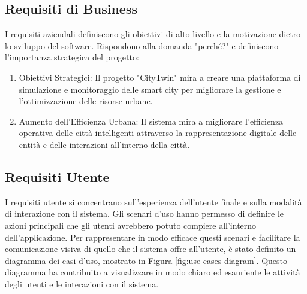 \documentclass[12pt]{article}
\begin{document}
\subsection{Requisiti di Business}
I requisiti aziendali definiscono gli obiettivi di alto livello e la motivazione dietro lo sviluppo del software. Rispondono alla domanda "perché?" e definiscono l'importanza strategica del progetto:
\begin{enumerate}
    \item Obiettivi Strategici: Il progetto "CityTwin" mira a creare una piattaforma di simulazione e monitoraggio delle smart city per migliorare la gestione e l'ottimizzazione delle risorse urbane.
    \item Aumento dell'Efficienza Urbana: Il sistema mira a migliorare l'efficienza operativa delle città intelligenti attraverso la rappresentazione digitale delle entità e delle interazioni all'interno della città.
\end{enumerate}

\subsection{Requisiti Utente}
I requisiti utente si concentrano sull'esperienza dell'utente finale e sulla modalità di interazione con il sistema.
Gli scenari d'uso hanno permesso di definire le azioni principali che gli utenti avrebbero potuto compiere all'interno dell'applicazione.
Per rappresentare in modo efficace questi scenari e facilitare la comunicazione visiva di quello che il sistema offre all'utente, è stato definito un diagramma dei casi d'uso, mostrato in Figura \ref{fig:use-cases-diagram}. Questo diagramma ha contribuito a visualizzare in modo chiaro ed esauriente le attività degli utenti e le interazioni con il sistema.
\end{document}
